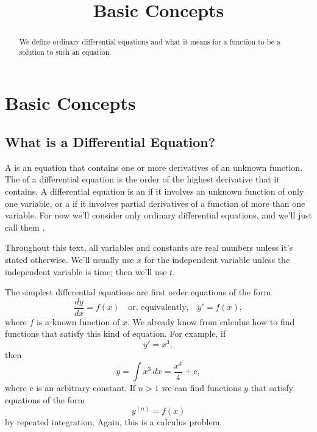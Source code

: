 \documentclass{ximera}
\title{Basic Concepts}
\begin{document}
 
\begin{abstract}
We define ordinary differential equations and what it means for a function to be a solution to such an equation.
\end{abstract}
 
\maketitle
 
\section*{Basic Concepts}
\subsection*{What is a Differential Equation?}
A  is an equation that contains one or more
derivatives of an unknown function. The  of a
differential equation is the order of the highest
derivative that it contains. A differential equation is an
 if it involves an unknown
function of only one variable, or a  if it involves partial derivatives of a function of more
than one variable. For now we'll consider only ordinary differential
equations, and we'll just call them .
 
Throughout this text, all variables and constants are real numbers unless it's
stated otherwise. We'll usually use $x$ for the independent variable
unless the independent variable is time; then we'll use $t$.
 
The simplest differential equations are first order equations of the
form
$$
\frac{dy}{dx}=f(x) \quad \text{or, equivalently,} \quad y'=f(x),
$$
where $f$  is a known function of $x$. We already know from calculus
how to find functions that satisfy this kind of equation. For example,
if
$$
y'=x^3,
$$
then
$$
y=\int x^3\, dx=\frac{x^4}{4}+c,
$$
 where $c$ is an arbitrary constant.  If $n>1$
we can find functions $y$ that satisfy
equations of the form
\begin{equation} \label{eq:1.2.1}
y^{(n)}=f(x)
\end{equation}
by repeated integration. Again, this is a calculus problem.
 
\end{document}
